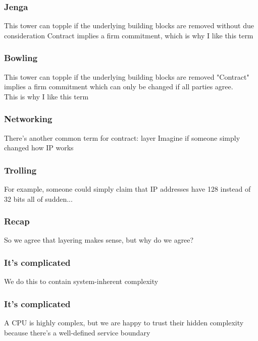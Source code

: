 \documentclass[t]{beamer}
\begin{document}
\begin{frame}
	\frametitle{Jenga}
	\begin{center}
		\vfill
		This tower can topple if the underlying building blocks are removed without due consideration
		\vfill
		Contract implies a firm commitment, which is why I like this term
		\vfill
	\end{center}
\end{frame}

\begin{frame}
	\frametitle{Bowling}
	\begin{center}
		\vfill
		This tower can topple if the underlying building blocks are removed 
		\vfill
		"Contract" implies a firm commitment which can only be changed if all parties agree.\\
		This is why I like this term
		\vfill
	\end{center}
\end{frame}

\begin{frame}
	\frametitle{Networking}
	\begin{center}
		\vfill
		There's another common term for contract: layer
		\vfill
		Imagine if someone simply changed how IP works
		\vfill
	\end{center}
\end{frame}

\begin{frame}
	\frametitle{Trolling}
	\begin{center}
		\vfill
		For example, someone could simply claim that IP addresses have 128 instead of 32 bits all of sudden...
		\vfill
	\end{center}
\end{frame}

\begin{frame}
	\frametitle{Recap}
	\begin{center}
		\vfill
		So we agree that layering makes sense, but why do we agree?
		\vfill
	\end{center}
\end{frame}

\begin{frame}
	\frametitle{It's complicated}
	\begin{center}
		\vfill
		We do this to contain system-inherent complexity
		\vfill
	\end{center}
\end{frame}

\begin{frame}
	\frametitle{It's complicated}
	\begin{center}
		\vfill
		A CPU is highly complex, but we are happy to trust their hidden complexity because there's a well-defined service boundary %
		\vfill
	\end{center}
\end{frame}
\end{document}
